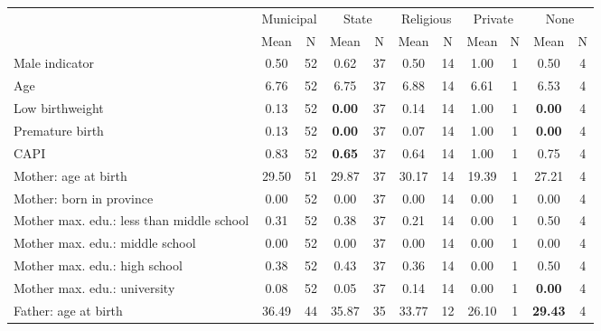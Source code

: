 \begin{tabular}{l c c c c c c c c c c}
\toprule
& \multicolumn{2}{c}{Municipal} & \multicolumn{2}{c}{State} & \multicolumn{2}{c}{Religious} & \multicolumn{2}{c}{Private} & \multicolumn{2}{c}{None} \\
& \scriptsize Mean & \scriptsize N & \scriptsize Mean & \scriptsize N & \scriptsize Mean & \scriptsize N & \scriptsize Mean & \scriptsize N & \scriptsize Mean & \scriptsize N \\
\midrule
Male indicator &      0.50 &        52 &      0.62 &        37 &      0.50 &        14 &      1.00 &         1 &      0.50 &         4 \\
Age &      6.76 &        52 &      6.75 &        37 &      6.88 &        14 &      6.61 &         1 &      6.53 &         4 \\
Low birthweight &      0.13 &        52 & \textbf{     0.00} &        37 &      0.14 &        14 &      1.00 &         1 & \textbf{     0.00} &         4 \\
Premature birth &      0.13 &        52 & \textbf{     0.00} &        37 &      0.07 &        14 &      1.00 &         1 & \textbf{     0.00} &         4 \\
CAPI &      0.83 &        52 & \textbf{     0.65} &        37 &      0.64 &        14 &      1.00 &         1 &      0.75 &         4 \\
Mother: age at birth &     29.50 &        51 &     29.87 &        37 &     30.17 &        14 &     19.39 &         1 &     27.21 &         4 \\
Mother: born in province &      0.00 &        52 &      0.00 &        37 &      0.00 &        14 &      0.00 &         1 &      0.00 &         4 \\
Mother max. edu.: less than middle school &      0.31 &        52 &      0.38 &        37 &      0.21 &        14 &      0.00 &         1 &      0.50 &         4 \\
Mother max. edu.: middle school &      0.00 &        52 &      0.00 &        37 &      0.00 &        14 &      0.00 &         1 &      0.00 &         4 \\
Mother max. edu.: high school &      0.38 &        52 &      0.43 &        37 &      0.36 &        14 &      0.00 &         1 &      0.50 &         4 \\
Mother max. edu.: university &      0.08 &        52 &      0.05 &        37 &      0.14 &        14 &      0.00 &         1 & \textbf{     0.00} &         4 \\
Father: age at birth &     36.49 &        44 &     35.87 &        35 &     33.77 &        12 &     26.10 &         1 & \textbf{    29.43} &         4 \\

\end{tabular}
